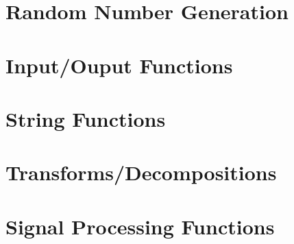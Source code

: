 \documentclass{book}
\begin{document}
\chapter{Random Number Generation}
















\chapter{Input/Ouput Functions}






































\chapter{String Functions}

















\chapter{Transforms/Decompositions}











\chapter{Signal Processing Functions}


\end{document}
